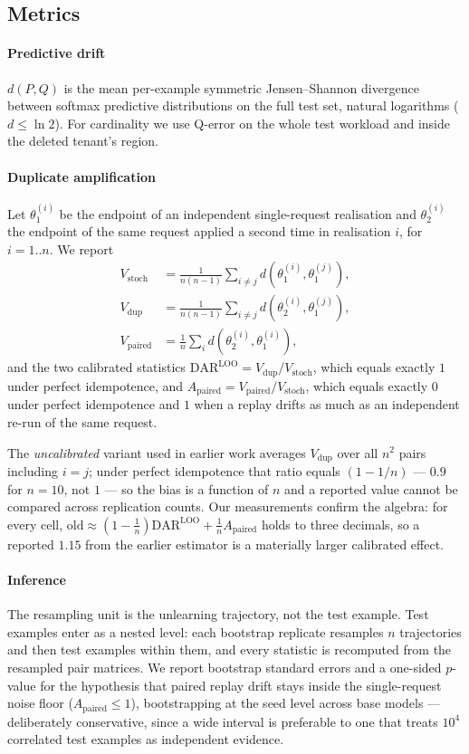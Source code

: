 \documentclass[conference]{IEEEtran}
\newcommand{\dar}{\mathrm{DAR}}
\newcommand{\DLOO}{\dar^{\mathrm{LOO}}}
\newcommand{\Apa}{A_{\mathrm{paired}}}
\begin{document}
\subsection{Metrics}

\paragraph{Predictive drift}
$d(P,Q)$ is the mean per-example symmetric Jensen--Shannon divergence between softmax
predictive distributions on the full test set, natural logarithms ($d\le\ln 2$).  For
cardinality we use Q-error on the whole test workload and inside the deleted tenant's
region.

\paragraph{Duplicate amplification}
Let $\theta^{(i)}_1$ be the endpoint of an independent single-request realisation
and $\theta^{(i)}_2$ the endpoint of the same request applied a second time in
realisation $i$, for $i=1..n$.  We report
\begin{align}
V_{\text{stoch}} &= \tfrac{1}{n(n-1)}\textstyle\sum_{i\ne j} d(\theta^{(i)}_1,\theta^{(j)}_1),\\
V_{\text{dup}}   &= \tfrac{1}{n(n-1)}\textstyle\sum_{i\ne j} d(\theta^{(i)}_2,\theta^{(j)}_1),\\
V_{\text{paired}}&= \tfrac{1}{n}\textstyle\sum_{i} d(\theta^{(i)}_2,\theta^{(i)}_1),
\end{align}
and the two calibrated statistics
$\DLOO = V_{\text{dup}}/V_{\text{stoch}}$, which equals exactly $1$ under perfect
idempotence, and $\Apa = V_{\text{paired}}/V_{\text{stoch}}$, which equals exactly
$0$ under perfect idempotence and $1$ when a replay drifts as much as an independent
re-run of the same request.

The \emph{uncalibrated} variant used in earlier work averages $V_{\text{dup}}$ over all $n^2$
pairs including $i=j$; under perfect idempotence that ratio equals $(1-1/n)$ --- $0.9$ for
$n=10$, not $1$ --- so the bias is a function of $n$ and a reported value cannot be compared
across replication counts.  Our measurements confirm the algebra: for every cell,
$\text{old}\approx(1-\tfrac1n)\DLOO+\tfrac1n\Apa$ holds to three decimals, so a reported $1.15$
from the earlier estimator is a materially larger calibrated effect.

\paragraph{Inference}
The resampling unit is the unlearning trajectory, not the test example.  Test examples enter
as a nested level: each bootstrap replicate resamples $n$ trajectories and then test examples
within them, and every statistic is recomputed from the resampled pair matrices.  We report
bootstrap standard errors and a one-sided $p$-value for the hypothesis that paired replay
drift stays inside the single-request noise floor ($\Apa\le1$), bootstrapping at the seed
level across base models --- deliberately conservative, since a wide interval is preferable to
one that treats $10^4$ correlated test examples as independent evidence.
\end{document}
